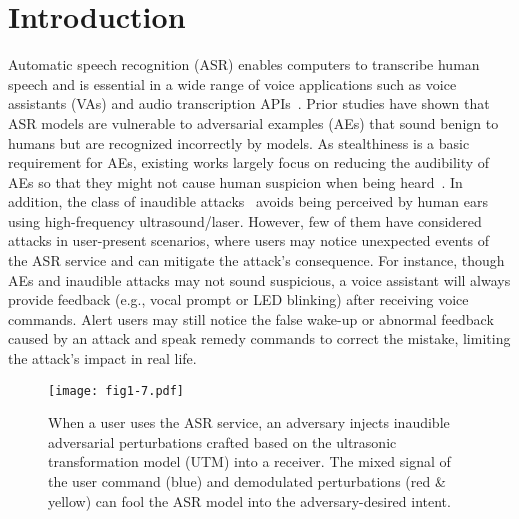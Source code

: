 
\section{Introduction}
Automatic speech recognition (ASR) enables computers to transcribe human speech and is essential in a wide range of voice applications such as voice assistants (VAs) and audio transcription APIs~\cite{azureasr,googleasr}.
Prior studies have shown that ASR models are vulnerable to adversarial examples (AEs) that sound benign to humans but are recognized incorrectly by models. 
As stealthiness is a basic requirement for AEs, existing works largely focus on reducing the audibility of AEs so that they might not cause human suspicion when being heard~\cite{schonherr2018adversarial,qin2019imperceptible}. In addition, the class of inaudible attacks~\cite{zhang2017dolphinattack,sugawara2020light} avoids being perceived by human ears using high-frequency ultrasound/laser.
However, few of them have considered attacks in user-present scenarios, where users may notice unexpected events of the ASR service and can mitigate the attack's consequence.
For instance, though AEs and inaudible attacks may not sound suspicious, a voice assistant will always provide feedback (e.g., vocal prompt or LED blinking) after receiving voice commands. Alert users may still notice the false wake-up or abnormal feedback caused by an attack and speak remedy commands to correct the mistake, limiting the attack's impact in real life.


\begin{figure}
    \centering
    \texttt{[image: fig1-7.pdf]}
    \caption{When a user uses the ASR service, an adversary injects inaudible adversarial perturbations crafted based on the ultrasonic transformation model (UTM) into a receiver. The mixed signal of the user command (blue) and demodulated perturbations (red \& yellow) can fool the ASR model into the adversary-desired intent.}
    \label{fig:fig1}
    \vspace{-15pt}
\end{figure}


